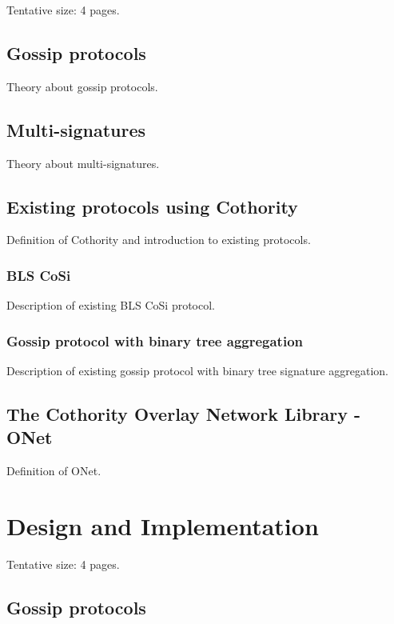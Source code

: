 \documentclass[a4paper,11pt,oneside]{report}
\begin{document}
Tentative size: 4 pages.

\section{Gossip protocols}
Theory about gossip protocols.

\section{Multi-signatures}
Theory about multi-signatures.

\section{Existing protocols using Cothority}
Definition of Cothority and introduction to existing protocols.

\subsection{BLS CoSi}
Description of existing BLS CoSi protocol.

\subsection{Gossip protocol with binary tree aggregation}
Description of existing gossip protocol with binary tree signature aggregation.

\section{The Cothority Overlay Network Library - ONet}
Definition of ONet.


\chapter{Design and Implementation}

% 

Tentative size: 4 pages.

\section{Gossip protocols}
\end{document}

